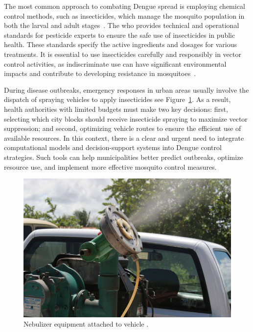 The most common approach to combating Dengue spread is employing chemical control methods, such as insecticides, which manage the mosquito population in both the larval and adult stages~\citep{brasil-dept-helth:2009}. The \gls{who} provides technical and operational standards for pesticide experts to ensure the safe use of insecticides in public health. These standards specify the active ingredients and dosages for various treatments. It is essential to use insecticides carefully and responsibly in vector control activities, as indiscriminate use can have significant environmental impacts and contribute to developing resistance in mosquitoes~\citep{WHO2009,WHO2020}.

During disease outbreaks, emergency responses in urban areas usually involve the dispatch of spraying vehicles to apply insecticides see Figure~\ref{fig:nebulizer}. As a result, health authorities with limited budgets must make two key decisions: first, selecting which city blocks should receive insecticide spraying to maximize vector suppression; and second, optimizing vehicle routes to ensure the efficient use of available resources. In this context, there is a clear and urgent need to integrate computational models and decision-support systems into Dengue control strategies. Such tools can help municipalities better predict outbreaks, optimize resource use, and implement more effective mosquito control measures. 

\begin{figure}[!ht]
  \centering
    \includegraphics[scale=0.5]{images/fumace.jpg}
    \caption{Nebulizer equipment attached to vehicle \citep{fumace-2022}.}
    \label{fig:nebulizer}
\end{figure}

